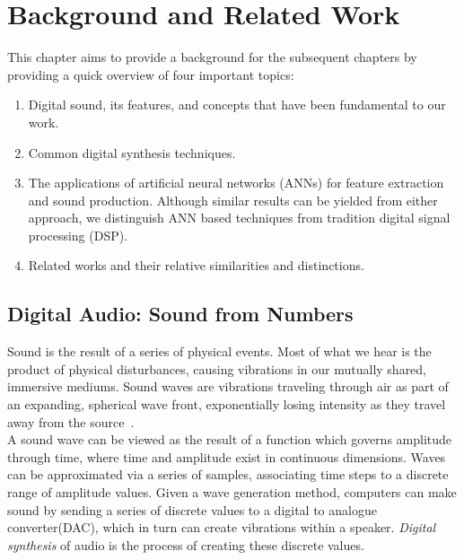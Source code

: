\documentclass[\main/thesis.tex]{subfiles}
\begin{document}
\chapter{Background and Related Work}
\label{section:background}
This chapter aims to provide a background for the subsequent chapters by providing a quick overview of four important topics:\\ 
\begin{enumerate}[label=(\roman*)]
\item Digital sound, its features, and concepts that have been fundamental to our work.
\item Common digital synthesis techniques.
\item The applications of artificial neural networks (ANNs) for feature extraction and sound production. Although similar results can be yielded from either approach, we distinguish ANN based techniques from tradition digital signal processing (DSP).
\item Related works and their relative similarities and distinctions.
\end{enumerate}
\section{Digital Audio: Sound from Numbers}
\label{sec:digital_audio}
Sound is the result of a series of physical events. Most of what we hear is the product of physical disturbances, causing vibrations in our mutually shared, immersive mediums. Sound waves are vibrations traveling through air as part of an expanding, spherical wave front, exponentially losing intensity as they travel away from the source~\cite{cook1999chap4}. 
\\

A sound wave can be viewed as the result of a function which governs amplitude through time, where time and amplitude exist in continuous dimensions. Waves can be approximated via a series of samples, associating time steps to a discrete range of amplitude values. 
Given a wave generation method, computers can make sound by sending a series of discrete values to a digital to analogue converter(DAC), which in turn can
create vibrations within a speaker.  \textit{Digital synthesis} of audio is the process of creating these discrete values. 
\\
\end{document}
